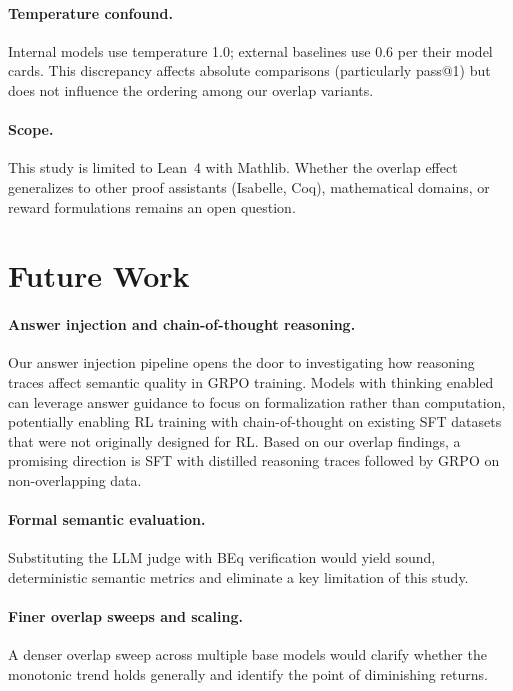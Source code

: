 \documentclass[11pt,a4paper]{article}
\begin{document}
\paragraph{Temperature confound.} Internal models use temperature 1.0; external baselines use 0.6 per their model cards. This discrepancy affects absolute comparisons (particularly pass@1) but does not influence the ordering among our overlap variants.

\paragraph{Scope.} This study is limited to Lean~4 with Mathlib. Whether the overlap effect generalizes to other proof assistants (Isabelle, Coq), mathematical domains, or reward formulations remains an open question.

\section{Future Work}\label{sec:future}

\paragraph{Answer injection and chain-of-thought reasoning.} Our answer injection pipeline opens the door to investigating how reasoning traces affect semantic quality in GRPO training. Models with thinking enabled can leverage answer guidance to focus on formalization rather than computation, potentially enabling RL training with chain-of-thought on existing SFT datasets that were not originally designed for RL. Based on our overlap findings, a promising direction is SFT with distilled reasoning traces followed by GRPO on non-overlapping data.

\paragraph{Formal semantic evaluation.} Substituting the LLM judge with BEq verification would yield sound, deterministic semantic metrics and eliminate a key limitation of this study.

\paragraph{Finer overlap sweeps and scaling.} A denser overlap sweep across multiple base models would clarify whether the monotonic trend holds generally and identify the point of diminishing returns.
\end{document}
